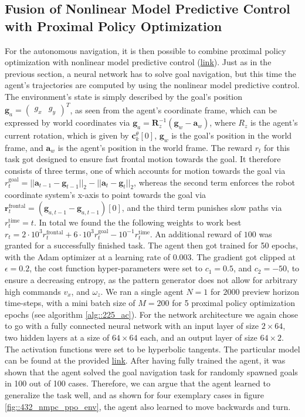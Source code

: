 \subsection{Fusion of Nonlinear Model Predictive Control with Proximal Policy Optimization}
\label{sec::431_fpp}
For the autonomous navigation, it is then possible to combine proximal policy optimization with nonlinear model predictive control (\href{https://github.com/mhubii/nmpc_pattern_generator/blob/dev/src/train_ppo_nmpc.cpp}{\underline{link}}). Just as in the previous section, a neural network has to solve goal navigation, but this time the agent's trajectories are computed by using the nonlinear model predictive control. The environment's state is simply described by the goal's position $\bm{g}_a=\begin{pmatrix}
g_x & g_y
\end{pmatrix}^T$, as seen from the agent's coordinate frame, which can be expressed by world coordinates via $\bm{g}_a = \bm{R}^{-1}_z(\bm{g}_w-\bm{a}_w)$, where $R_z$ is the agent's current rotation, which is given by $\bm{c}_k^\theta[0]$, $\bm{g}_w$ is the goal's position in the world frame, and $\bm{a}_w$ is the agent's position in the world frame. The reward $r_t$ for this task got designed to ensure fast frontal motion towards the goal. It therefore consists of three terms, one of which accounts for motion towards the goal via $r_t^\text{goal} = ||\bm{a}_{t-1}-\bm{g}_{t-1}||_2 - ||\bm{a}_t-\bm{g}_t||_2$, whereas the second term enforces the robot coordinate system's x-axis to point towards the goal via $\bm{r}_t^\text{frontal} = (\bm{g}_{a,t-1}-\bm{g}_{a,t-1})[0]$, and the third term punishes slow paths via $r_t^\text{time}=t$. In total we found the the following weights to work best $r_t=2\cdot10^3r_t^\text{frontal}+6\cdot10^3r_t^\text{goal}-10^{-1}r_t^\text{time}$. An additional reward of $100$ was granted for a successfully finished task. The agent then got trained for 50 epochs, with the Adam optimizer at a learning rate of 0.003. The gradient got clipped at $\epsilon=0.2$, the cost function hyper-parameters were set to $c_1=0.5$, and $c_2=-50$, to ensure a decreasing entropy, as the pattern generator does not allow for arbitrary high commands $v_x$, and $\omega_z$. We ran a single agent $N=1$ for $2000$ preview horizon time-steps, with a mini batch size of $M=200$ for 5 proximal policy optimization epochs (see algorithm \ref{alg::225_ac}). For the network architecture we again chose to go with a fully connected neural network with an input layer of size $2\times64$, two hidden layers at a size of $64\times64$ each, and an output layer of size $64\times2$. The activation functions were set to be hyperbolic tangents. The particular model can be found at the provided \href{https://github.com/mhubii/nmpc_pattern_generator/blob/df058feeb5ba3afd88f2a855e5af148d25c23020/libs/learning/include/learning/models.h#L100}{\underline{link}}. After having fully trained the agent, it was shown that the agent solved the goal navigation task for randomly spawned goals in 100 out of 100 cases. Therefore, we can argue that the agent learned to generalize the task well, and as shown for four exemplary cases in figure \ref{fig::432_nmpc_ppo_env}, the agent also learned to move backwards and turn. 
